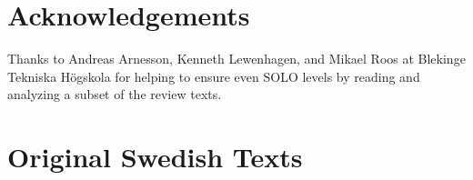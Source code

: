 \documentclass[twoside,twocolumn,a4paper,11pt,english]{article}
\begin{document}

\section{Acknowledgements}

Thanks to Andreas Arnesson, Kenneth Lewenhagen, and Mikael Roos at Blekinge Tekniska Högskola for helping to ensure even SOLO levels by reading and analyzing a subset of the review texts.







\newpage

\appendix

\section{Original Swedish Texts} \label{app:original}
\end{document}
